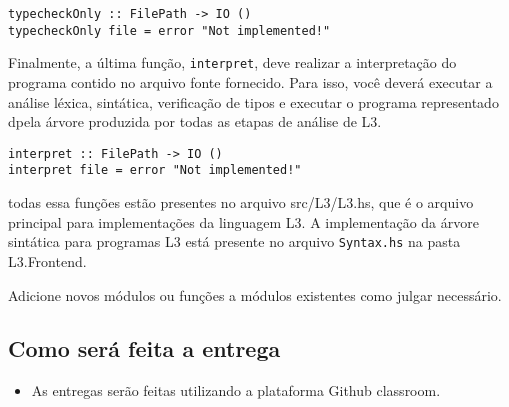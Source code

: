 \documentclass[a4paper,11pt]{article}
\begin{document}
\begin{verbatim}
typecheckOnly :: FilePath -> IO ()
typecheckOnly file = error "Not implemented!"
\end{verbatim}

Finalmente, a última função, \texttt{interpret}, deve realizar a interpretação do programa
contido no arquivo fonte fornecido. Para isso, você deverá executar a análise léxica,
sintática, verificação de tipos e executar o programa representado dpela árvore
produzida por todas as etapas de análise de L3.

\begin{verbatim}
interpret :: FilePath -> IO ()
interpret file = error "Not implemented!"
\end{verbatim}

todas essa funções estão presentes no arquivo src/L3/L3.hs, que é o arquivo principal
para implementações da linguagem L3.
A implementação da árvore sintática para programas L3 está presente no arquivo \texttt{Syntax.hs}
na pasta L3.Frontend.

Adicione novos módulos ou funções a módulos existentes como julgar necessário.
\subsection*{Como será feita a entrega}
\label{sec:org2afc33d}

\begin{itemize}
\item As entregas serão feitas utilizando a plataforma Github classroom.
\end{itemize}
\end{document}
